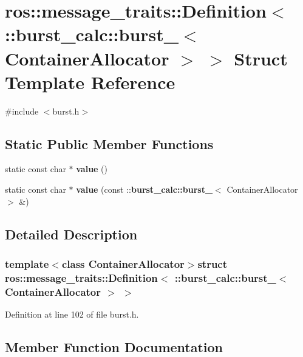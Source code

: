 \section{ros\-:\-:message\-\_\-traits\-:\-:\-Definition$<$ \-:\-:burst\-\_\-calc\-:\-:burst\-\_\-$<$ \-Container\-Allocator $>$ $>$ \-Struct \-Template \-Reference}
\label{structros_1_1message__traits_1_1Definition_3_01_1_1burst__calc_1_1burst___3_01ContainerAllocator_01_4_01_4}


{\ttfamily \#include $<$burst.\-h$>$}

\subsection*{\-Static \-Public \-Member \-Functions}
\begin{DoxyCompactItemize}
\item 
static const char $\ast$ {\bf value} ()
\item 
static const char $\ast$ {\bf value} (const \-::{\bf burst\-\_\-calc\-::burst\-\_\-}$<$ \-Container\-Allocator $>$ \&)
\end{DoxyCompactItemize}


\subsection{\-Detailed \-Description}
\subsubsection*{template$<$class Container\-Allocator$>$struct ros\-::message\-\_\-traits\-::\-Definition$<$ \-::burst\-\_\-calc\-::burst\-\_\-$<$ Container\-Allocator $>$ $>$}



\-Definition at line 102 of file burst.\-h.



\subsection{\-Member \-Function \-Documentation}
